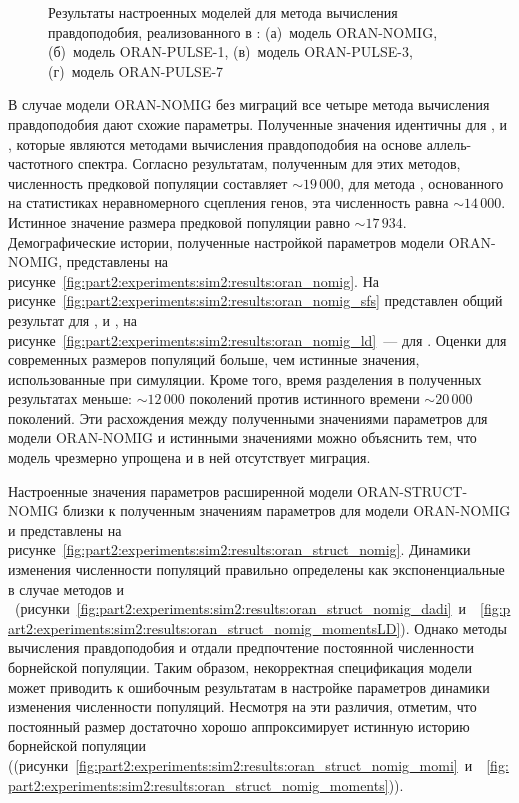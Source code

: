 \begin{figure}[ht]
\begin{subfigure}[b]{0.24\linewidth}
        \caption{}
        \label{fig:part2:experiments:sim2:results:oran_pulse_7}
    \end{subfigure}
    \caption{Результаты настроенных моделей для метода вычисления правдоподобия, реализованного в \momi: (а)~модель ORAN-NOMIG, (б)~модель ORAN-PULSE-1, (в)~модель ORAN-PULSE-3, (г)~модель ORAN-PULSE-7}
    \label{fig:part2:experiments:sim2:results:oran_momi}
\end{figure}

В случае модели ORAN-NOMIG без миграций все четыре метода вычисления правдоподобия дают схожие параметры.
Полученные значения идентичны для \dadi, \moments и \momi, которые являются методами вычисления правдоподобия на основе аллель-частотного спектра.
Согласно результатам, полученным для этих методов, численность предковой популяции составляет ${\sim}19{\,}000$, для метода \momentsLD, основанного на статистиках неравномерного сцепления генов, эта численность равна ${\sim}14{\,}000$.
Истинное значение размера предковой популяции равно ${\sim}17{\,}934$.
Демографические истории, полученные настройкой параметров модели ORAN-NOMIG, представлены на рисунке~\ref{fig:part2:experiments:sim2:results:oran_nomig}.
На рисунке~\ref{fig:part2:experiments:sim2:results:oran_nomig_sfs} представлен общий результат для \dadi, \moments и \momi, на рисунке~\ref{fig:part2:experiments:sim2:results:oran_nomig_ld}~--- для \momentsLD.
Оценки для современных размеров популяций больше, чем истинные значения, использованные при симуляции.
Кроме того, время разделения в полученных результатах меньше: ${\sim}12{\,}000$ поколений против истинного времени ${\sim}20{\,}000$ поколений.
Эти расхождения между полученными значениями параметров для модели ORAN-NOMIG и истинными значениями можно объяснить тем, что модель чрезмерно упрощена и в ней отсутствует миграция.


Настроенные значения параметров расширенной модели ORAN-STRUCT-NOMIG близки к полученным значениям параметров для модели ORAN-NOMIG и представлены на рисунке~\ref{fig:part2:experiments:sim2:results:oran_struct_nomig}.
Динамики изменения численности популяций правильно определены как экспоненциальные в случае методов \dadi и \momentsLD~(рисунки~\ref{fig:part2:experiments:sim2:results:oran_struct_nomig_dadi}~и~~\ref{fig:part2:experiments:sim2:results:oran_struct_nomig_momentsLD}). 
Однако методы вычисления правдоподобия \momi и \moments отдали предпочтение постоянной численности борнейской популяции.
Таким образом, некорректная спецификация модели может приводить к ошибочным результатам в настройке параметров динамики изменения численности популяций.
Несмотря на эти различия, отметим, что постоянный размер достаточно хорошо аппроксимирует истинную историю борнейской популяции ((рисунки~\ref{fig:part2:experiments:sim2:results:oran_struct_nomig_momi}~и~~\ref{fig:part2:experiments:sim2:results:oran_struct_nomig_moments})).

